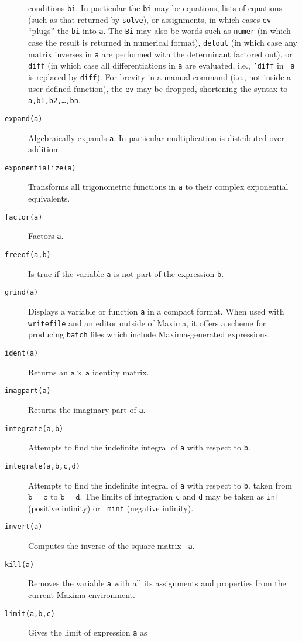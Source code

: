 \documentclass[a4paper,12pt]{article}
\begin{document}
\begin{description}
  conditions {\tt bi}.  In particular the {\tt bi} may be equations,
  lists of equations (such as that returned by {\tt solve}), or
  assignments, in which cases {\tt ev} ``plugs'' the {\tt bi} into
  {\tt a}.  The {\tt Bi} may also be words such as {\tt numer} (in
  which case the result is returned in numerical format), {\tt detout}
  (in which case any matrix inverses in {\tt a} are performed with the
  determinant factored out), or {\tt diff} (in which case all
  differentiations in {\tt a} are evaluated, i.e., {\tt 'diff} in {\tt
    a} is replaced by {\tt diff}).  For brevity in a manual command
  (i.e., not inside a user-defined function), the {\tt ev} may be
  dropped, shortening the syntax to {\tt a,b1,b2,\ldots,bn}.
\item[{\tt expand(a)}] Algebraically expands {\tt a}.  In particular
  multiplication is distributed over addition.
\item[{\tt exponentialize(a)}] Transforms all trigonometric functions
  in {\tt a} to their complex exponential equivalents.
\item[{\tt factor(a)}] Factors {\tt a}.
\item[{\tt freeof(a,b)}] Is true if the variable {\tt a} is not part
  of the expression {\tt b}.
\item[{\tt grind(a)}] Displays a variable or function {\tt a} in a
  compact format.  When used with {\tt writefile} and an editor
  outside of Maxima, it offers a scheme for producing {\tt batch}
  files which include Maxima-generated expressions.
\item[{\tt ident(a)}] Returns an $\mathtt{a} \times\, \mathtt{a}$
  identity matrix.
\item[{\tt imagpart(a)}] Returns the imaginary part of {\tt a}.
\item[{\tt integrate(a,b)}] Attempts to find the indefinite integral
  of {\tt a} with respect to {\tt b}.
\item[{\tt integrate(a,b,c,d)}] Attempts to find the indefinite
  integral of {\tt a} with respect to {\tt b}. taken from
  $\mathtt{b=c}$ to $\mathtt{b=d}$.  The limits of integration {\tt c}
  and {\tt d} may be taken as {\tt inf} (positive infinity) or {\tt
    minf} (negative infinity).
\item[{\tt invert(a)}] Computes the inverse of the square matrix {\tt
    a}.
\item[{\tt kill(a)}] Removes the variable {\tt a} with all its
  assignments and properties from the current Maxima environment.
\item[{\tt limit(a,b,c)}] Gives the limit of expression {\tt a} as

\end{description}
\end{document}

